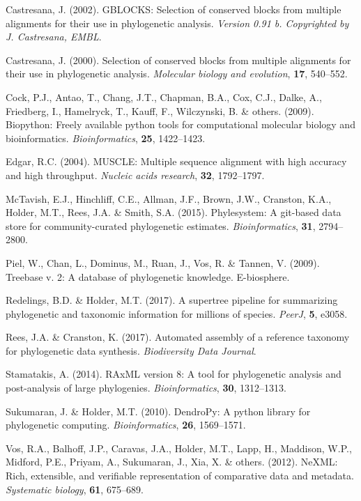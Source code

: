 \documentclass[]{article}
\begin{document}
\leavevmode\hypertarget{ref-castresana2002gblocks}{}%
Castresana, J. (2002). GBLOCKS: Selection of conserved blocks from multiple alignments for their use in phylogenetic analysis. \emph{Version 0.91 b. Copyrighted by J. Castresana, EMBL}.

\leavevmode\hypertarget{ref-castresana2000selection}{}%
Castresana, J. (2000). Selection of conserved blocks from multiple alignments for their use in phylogenetic analysis. \emph{Molecular biology and evolution}, \textbf{17}, 540--552.

\leavevmode\hypertarget{ref-cock2009biopython}{}%
Cock, P.J., Antao, T., Chang, J.T., Chapman, B.A., Cox, C.J., Dalke, A., Friedberg, I., Hamelryck, T., Kauff, F., Wilczynski, B. \& others. (2009). Biopython: Freely available python tools for computational molecular biology and bioinformatics. \emph{Bioinformatics}, \textbf{25}, 1422--1423.

\leavevmode\hypertarget{ref-edgar2004muscle}{}%
Edgar, R.C. (2004). MUSCLE: Multiple sequence alignment with high accuracy and high throughput. \emph{Nucleic acids research}, \textbf{32}, 1792--1797.

\leavevmode\hypertarget{ref-mctavish2015phylesystem}{}%
McTavish, E.J., Hinchliff, C.E., Allman, J.F., Brown, J.W., Cranston, K.A., Holder, M.T., Rees, J.A. \& Smith, S.A. (2015). Phylesystem: A git-based data store for community-curated phylogenetic estimates. \emph{Bioinformatics}, \textbf{31}, 2794--2800.

\leavevmode\hypertarget{ref-piel2009treebase}{}%
Piel, W., Chan, L., Dominus, M., Ruan, J., Vos, R. \& Tannen, V. (2009). Treebase v. 2: A database of phylogenetic knowledge. E-biosphere.

\leavevmode\hypertarget{ref-redelings2017supertree}{}%
Redelings, B.D. \& Holder, M.T. (2017). A supertree pipeline for summarizing phylogenetic and taxonomic information for millions of species. \emph{PeerJ}, \textbf{5}, e3058.

\leavevmode\hypertarget{ref-rees2017automated}{}%
Rees, J.A. \& Cranston, K. (2017). Automated assembly of a reference taxonomy for phylogenetic data synthesis. \emph{Biodiversity Data Journal}.

\leavevmode\hypertarget{ref-stamatakis2014raxml}{}%
Stamatakis, A. (2014). RAxML version 8: A tool for phylogenetic analysis and post-analysis of large phylogenies. \emph{Bioinformatics}, \textbf{30}, 1312--1313.

\leavevmode\hypertarget{ref-sukumaran2010dendropy}{}%
Sukumaran, J. \& Holder, M.T. (2010). DendroPy: A python library for phylogenetic computing. \emph{Bioinformatics}, \textbf{26}, 1569--1571.

\leavevmode\hypertarget{ref-vos2012nexml}{}%
Vos, R.A., Balhoff, J.P., Caravas, J.A., Holder, M.T., Lapp, H., Maddison, W.P., Midford, P.E., Priyam, A., Sukumaran, J., Xia, X. \& others. (2012). NeXML: Rich, extensible, and verifiable representation of comparative data and metadata. \emph{Systematic biology}, \textbf{61}, 675--689.
\end{document}
